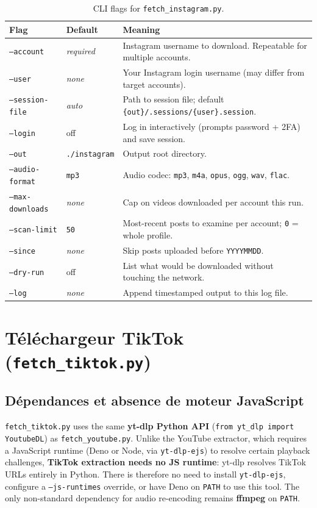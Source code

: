 \documentclass[11pt,a4paper]{report}
\newcommand{\code}[1]{\texttt{\small #1}}
\begin{document}
\begin{table}[ht]
\centering
\small
\renewcommand{\arraystretch}{1.25}
\begin{tabularx}{\textwidth}{@{}l l X@{}}
\toprule
\textbf{Flag} & \textbf{Default} & \textbf{Meaning} \\
\midrule
\code{--account} & \emph{required} & Instagram username to download. Repeatable for multiple accounts. \\
\code{--user} & \emph{none} & Your Instagram login username (may differ from target accounts). \\
\code{--session-file} & \emph{auto} & Path to session file; default \code{\{out\}/.sessions/\{user\}.session}. \\
\code{--login} & off & Log in interactively (prompts password + 2FA) and save session. \\
\code{--out} & \code{./instagram} & Output root directory. \\
\code{--audio-format} & \code{mp3} & Audio codec: \code{mp3}, \code{m4a}, \code{opus}, \code{ogg}, \code{wav}, \code{flac}. \\
\code{--max-downloads} & \emph{none} & Cap on videos downloaded per account this run. \\
\code{--scan-limit} & \code{50} & Most-recent posts to examine per account; \code{0} = whole profile. \\
\code{--since} & \emph{none} & Skip posts uploaded before \code{YYYYMMDD}. \\
\code{--dry-run} & off & List what would be downloaded without touching the network. \\
\code{--log} & \emph{none} & Append timestamped output to this log file. \\
\bottomrule
\end{tabularx}
\caption{CLI flags for \texttt{fetch\_instagram.py}.}
\label{tab:ig-flags}
\end{table}

\section{Téléchargeur TikTok (\texttt{fetch\_tiktok.py})}

\subsection{Dépendances et absence de moteur JavaScript}

\texttt{fetch\_tiktok.py} uses the same \textbf{yt-dlp Python API}
(\code{from yt\_dlp import YoutubeDL}) as \texttt{fetch\_youtube.py}.
Unlike the YouTube extractor, which requires a JavaScript runtime (Deno or Node,
via \code{yt-dlp-ejs}) to resolve certain playback challenges, \textbf{TikTok
extraction needs no JS runtime}: yt-dlp resolves TikTok URLs entirely in Python.
There is therefore no need to install \code{yt-dlp-ejs}, configure a \code{--js-runtimes}
override, or have Deno on \code{PATH} to use this tool. The only non-standard
dependency for audio re-encoding remains \textbf{ffmpeg} on \code{PATH}.
\end{document}
